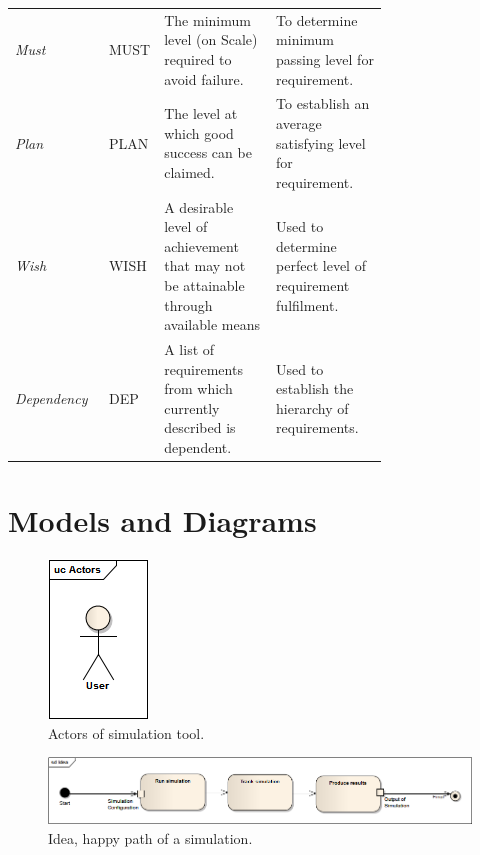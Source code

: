 \begin{appendices}
\begin{table}[!htbp]
\begin{tabular}{@{}lp{0.14\linewidth}p{0.3\linewidth}p{0.3\linewidth}@{}}
			\emph{Must}			 	 & MUST    & The minimum level (on Scale) required to avoid failure. & To determine minimum passing level for requirement.\\
			\emph{Plan}				 & PLAN    & The level at which good success can be claimed. & To establish an average satisfying level for requirement. \\
			\emph{Wish}			 	 & WISH    & A desirable level of achievement that may not be attainable through available means & Used to determine perfect level of requirement fulfilment.\\
			\emph{Dependency}		 & DEP     & A list of requirements from which currently described is dependent. & Used to establish the hierarchy of requirements.\\
			\bottomrule
		\end{tabular}
	\end{table}
	\clearpage
	
	\chapter{Models and Diagrams}
		\begin{figure}[!hbtp]
			\centering
			\includegraphics[scale=1]{../ea_files/generatedImages/Simulator/Actors.png}
			\caption{Actors of simulation tool.}
			\label{fig:actors}
		\end{figure}
		
		\begin{figure}[!hbtp]
			\centering
			\includegraphics[width=\textwidth]{../ea_files/generatedImages/Simulator/Idea.png}
			\caption{Idea, happy path of a simulation.}
			\label{fig:idea}
		\end{figure}
	

\end{appendices}
